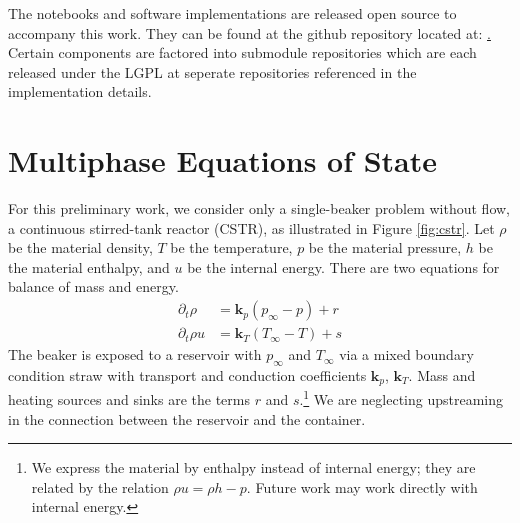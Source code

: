 \documentclass[]{article}
\begin{document}
The notebooks and software implementations are released open source to
accompany this work. They can be found at the github repository
located at: \href{https://github.com/afqueiruga/latentsim}.
Certain components are factored into submodule repositories which are
each released under the LGPL at seperate repositories referenced in
the implementation details.

\section{Multiphase Equations of State}


For this preliminary work, we consider only a single-beaker problem
without flow, a continuous stirred-tank reactor (CSTR), as illustrated
in Figure \ref{fig:cstr}. Let \(\rho\) be the material density, \(T\) be the
temperature, \(p\) be the material pressure, \(h\) be the material
enthalpy, and \(u\) be the internal energy. There are two equations for
balance of mass and energy.
\begin{align}
\partial_t \rho & = \mathbf{k}_p(p_\infty - p) + r\\
\partial_t \rho u & = \mathbf{k}_T(T_\infty-T) + s 
\end{align}
The beaker is exposed to a reservoir with \(p_\infty\) and \(T_\infty\)
via a mixed boundary condition straw with transport and conduction
coefficients \(\mathbf{k}_p\), \(\mathbf{k}_T\). Mass and heating
sources and sinks are the terms \(r\) and \(s\).\footnote{We express the
  material by enthalpy instead of internal energy; they are related by
  the relation \(\rho u = \rho h - p\). Future work may work directly
  with internal energy.}
We are neglecting upstreaming in the connection between the reservoir
and the container.
\end{document}
